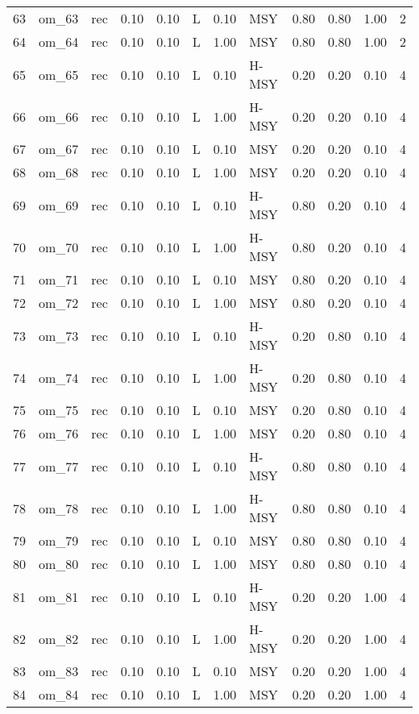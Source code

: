 \begin{table}[ht]
\begin{tabular}{rllrrlrlrrrr}
  63 & om\_63 & rec & 0.10 & 0.10 & L & 0.10 & MSY & 0.80 & 0.80 & 1.00 &   2 \\ 
  64 & om\_64 & rec & 0.10 & 0.10 & L & 1.00 & MSY & 0.80 & 0.80 & 1.00 &   2 \\ 
  65 & om\_65 & rec & 0.10 & 0.10 & L & 0.10 & H-MSY & 0.20 & 0.20 & 0.10 &   4 \\ 
  66 & om\_66 & rec & 0.10 & 0.10 & L & 1.00 & H-MSY & 0.20 & 0.20 & 0.10 &   4 \\ 
  67 & om\_67 & rec & 0.10 & 0.10 & L & 0.10 & MSY & 0.20 & 0.20 & 0.10 &   4 \\ 
  68 & om\_68 & rec & 0.10 & 0.10 & L & 1.00 & MSY & 0.20 & 0.20 & 0.10 &   4 \\ 
  69 & om\_69 & rec & 0.10 & 0.10 & L & 0.10 & H-MSY & 0.80 & 0.20 & 0.10 &   4 \\ 
  70 & om\_70 & rec & 0.10 & 0.10 & L & 1.00 & H-MSY & 0.80 & 0.20 & 0.10 &   4 \\ 
  71 & om\_71 & rec & 0.10 & 0.10 & L & 0.10 & MSY & 0.80 & 0.20 & 0.10 &   4 \\ 
  72 & om\_72 & rec & 0.10 & 0.10 & L & 1.00 & MSY & 0.80 & 0.20 & 0.10 &   4 \\ 
  73 & om\_73 & rec & 0.10 & 0.10 & L & 0.10 & H-MSY & 0.20 & 0.80 & 0.10 &   4 \\ 
  74 & om\_74 & rec & 0.10 & 0.10 & L & 1.00 & H-MSY & 0.20 & 0.80 & 0.10 &   4 \\ 
  75 & om\_75 & rec & 0.10 & 0.10 & L & 0.10 & MSY & 0.20 & 0.80 & 0.10 &   4 \\ 
  76 & om\_76 & rec & 0.10 & 0.10 & L & 1.00 & MSY & 0.20 & 0.80 & 0.10 &   4 \\ 
  77 & om\_77 & rec & 0.10 & 0.10 & L & 0.10 & H-MSY & 0.80 & 0.80 & 0.10 &   4 \\ 
  78 & om\_78 & rec & 0.10 & 0.10 & L & 1.00 & H-MSY & 0.80 & 0.80 & 0.10 &   4 \\ 
  79 & om\_79 & rec & 0.10 & 0.10 & L & 0.10 & MSY & 0.80 & 0.80 & 0.10 &   4 \\ 
  80 & om\_80 & rec & 0.10 & 0.10 & L & 1.00 & MSY & 0.80 & 0.80 & 0.10 &   4 \\ 
  81 & om\_81 & rec & 0.10 & 0.10 & L & 0.10 & H-MSY & 0.20 & 0.20 & 1.00 &   4 \\ 
  82 & om\_82 & rec & 0.10 & 0.10 & L & 1.00 & H-MSY & 0.20 & 0.20 & 1.00 &   4 \\ 
  83 & om\_83 & rec & 0.10 & 0.10 & L & 0.10 & MSY & 0.20 & 0.20 & 1.00 &   4 \\ 
  84 & om\_84 & rec & 0.10 & 0.10 & L & 1.00 & MSY & 0.20 & 0.20 & 1.00 &   4 \\ 

\end{tabular}
\end{table}
